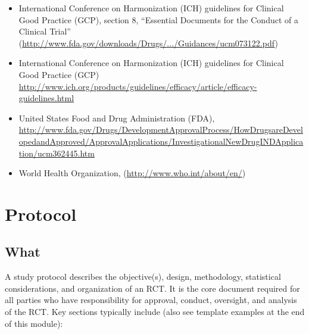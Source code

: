 \documentclass[]{book}
\providecommand{\tightlist}{%
  \setlength{\itemsep}{0pt}\setlength{\parskip}{0pt}}
\begin{document}
\begin{itemize}
\tightlist
\item
  International Conference on Harmonization (ICH) guidelines for
  Clinical Good Practice (GCP), section 8, ``Essential Documents for the
  Conduct of a Clinical Trial''
  (\url{http://www.fda.gov/downloads/Drugs/.../Guidances/ucm073122.pdf})
\item
  International Conference on Harmonization (ICH) guidelines for
  Clinical Good Practice (GCP)
  \url{http://www.ich.org/products/guidelines/efficacy/article/efficacy-guidelines.html}
\item
  United States Food and Drug Administration (FDA),
  \url{http://www.fda.gov/Drugs/DevelopmentApprovalProcess/HowDrugsareDevelopedandApproved/ApprovalApplications/InvestigationalNewDrugINDApplication/ucm362445.htm}
\item
  World Health Organization, (\url{http://www.who.int/about/en/})
\end{itemize}

\section{Protocol}\label{protocol}

\subsection{What}\label{what-11}

A study protocol describes the objective(s), design, methodology,
statistical considerations, and organization of an RCT. It is the core
document required for all parties who have responsibility for approval,
conduct, oversight, and analysis of the RCT. Key sections typically
include (also see template examples at the end of this module):
\end{document}
